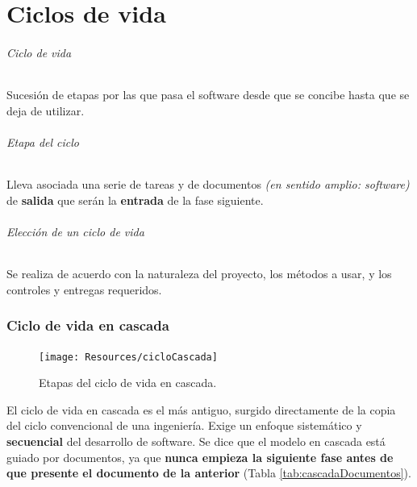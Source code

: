 \part{Ciclos de vida}

\paragraph{Ciclo de vida}  Sucesión de etapas por las que pasa el software desde que se concibe hasta que se deja de utilizar.

\paragraph{Etapa del ciclo} Lleva asociada una serie de tareas y de documentos \textit{(en sentido amplio: software)} de \textbf{salida} que serán la \textbf{entrada} de la fase siguiente.

\paragraph{Elección de un ciclo de vida} Se realiza de acuerdo con la naturaleza del proyecto, los métodos a usar, y los controles y entregas requeridos.

\section{Ciclo de vida en cascada}
\begin{figure}[H]
   \centering
   \texttt{[image: Resources/cicloCascada]}
   \caption{Etapas del ciclo de vida en cascada.}
   \label{fig:procesoCascada}
\end{figure}
El ciclo de vida en cascada es el más antiguo, surgido directamente de la copia del ciclo convencional de una ingeniería. Exige un enfoque sistemático y \textbf{secuencial} del desarrollo de software. Se dice que el modelo en cascada está guiado por documentos, ya que \textbf{nunca empieza la siguiente fase antes de que presente el documento de la anterior} (Tabla \ref{tab:cascadaDocumentos}).\\

